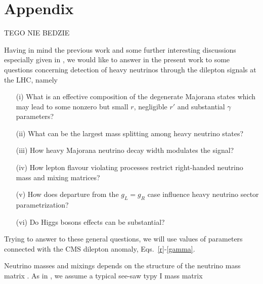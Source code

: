 \documentclass[twocolumn,superscriptaddress,showpacs,prl,nofootinbib,floatfix]{revtex4}
\begin{document}
  

\section{Appendix}

TEGO NIE BEDZIE

Having in mind the previous work \cite{Gluza:2015goa} and some further interesting discussions especially given in  \cite{Dobrescu:2015qna,Brehmer:2015cia,Coloma:2015una,Dev:2015pga}, we would like to answer in the present work to some  questions concerning detection of heavy neutrinos through the dilepton signals at the LHC, namely  

\begin{itemize}
\item[(i)] What is an effective composition of the degenerate Majorana states which may lead
to some nonzero but small $r$, negligible $r'$ and substantial $\gamma$ parameters?
\item[(ii)] What can be the largest mass splitting among heavy neutrino states?
\item[(iii)] How heavy Majorana neutrino decay width modulates the signal?
\item[(iv)] How lepton flavour violating processes restrict right-handed neutrino mass and mixing matrices?
\item[(v)] How does departure from the $g_L=g_R$ case influence heavy neutrino sector parametrization?
\item[(vi)] Do Higgs bosons effects can be substantial?
\end{itemize}

Trying to answer to these general questions, we will use values of parameters connected with the CMS dilepton anomaly, Eqs.~\ref{r}-\ref{gamma}. 


Neutrino masses and mixings depends on the structure of the neutrino mass matrix 
\cite{Bilenky:1987ty}. As in \cite{Gluza:2015goa}, we assume a typical see-saw typy I mass matrix
\end{document}
